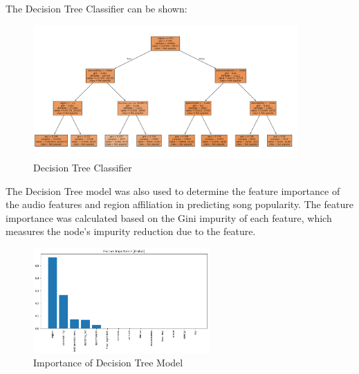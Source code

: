 The Decision Tree Classifier can be shown:

\begin{figure}[H] 
    \centering 
    \includegraphics[width=0.9\textwidth]{media/decision_tree.png}
    \caption{Decision Tree Classifier}
    \label{fig:decision_tree}
\end{figure}


\newpage
The Decision Tree model was also used to determine the feature importance of the audio features and region affiliation in predicting song popularity. The feature importance was calculated based on the Gini impurity of each feature, which measures the node's impurity reduction due to the feature. 

\begin{figure}[h] 
    \centering 
    \includegraphics[width=0.6\textwidth]{media/dt_global_feature_importance.png}
    \caption{Importance of Decision Tree Model}
\end{figure}

